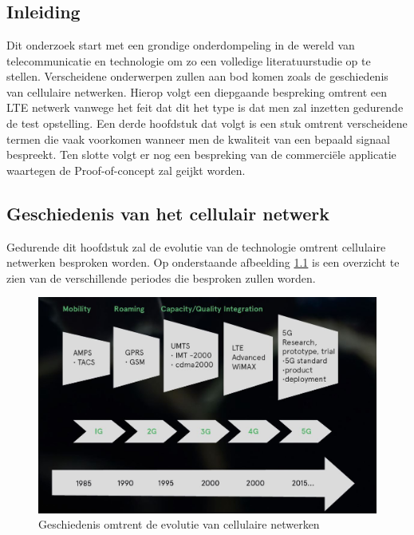 \chapter{}%
\label{ch:stand-van-zaken}



\section{Inleiding}

Dit onderzoek start met een grondige onderdompeling in de wereld van telecommunicatie en technologie om zo een volledige literatuurstudie op te stellen. Verscheidene onderwerpen zullen aan bod komen zoals de geschiedenis van cellulaire netwerken. Hierop volgt een diepgaande bespreking omtrent een LTE netwerk vanwege het feit dat dit het type is dat men zal inzetten gedurende de test opstelling. Een derde hoofdstuk dat volgt is een stuk omtrent verscheidene termen die vaak voorkomen wanneer men de kwaliteit van een bepaald signaal bespreekt. Ten slotte volgt er nog een bespreking van de commerciële applicatie waartegen de Proof-of-concept zal geijkt worden.

\pagebreak

\section{Geschiedenis van het cellulair netwerk}

Gedurende dit hoofdstuk zal de evolutie van de technologie omtrent cellulaire netwerken besproken worden. Op onderstaande afbeelding \ref{fig:cellularhistory} is een overzicht te zien van de verschillende periodes die besproken zullen worden.

\begin{figure}[!htb]
    \includegraphics[width=1\linewidth]{graphics/cellular_history_timeline}
    \caption[Overzicht omtrent de geschiedenis van cellulaire netwerken]{Geschiedenis omtrent de evolutie van cellulaire netwerken \autocite{Keenan2020}}
    \label{fig:cellularhistory}
\end{figure}

